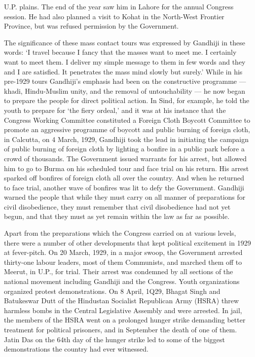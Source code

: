 U.P. plains. The end of the year saw him in Lahore for the annual Congress session. He had also planned a visit to Kohat in the North-West Frontier Province, but was refused permission by the Government. 

The significance of these mass contact tours was expressed by Gandhiji in these words: `I travel because I fancy that the masses want to meet me. I certainly want to meet them. I deliver my simple message to them in few words and they and I are satisfied. It penetrates the mass mind slowly but surely.' While in his pre-1929 tours Gandhiji's emphasis had been on the constructive programme — khadi, Hindu-Muslim unity, and the removal of untouchability — he now began to prepare the people for direct political action. In Sind, for example, he told the youth to prepare for `the fiery ordeal,' and it was at his instance that the Congress Working Committee constituted a Foreign Cloth Boycott Committee to promote an aggressive programme of boycott and public burning of foreign cloth, in Calcutta, on 4 March, 1929, Gandhiji took the lead in initiating the campaign of public burning of foreign cloth by lighting a bonfire in a public park before a crowd of thousands. The Government issued warrants for his arrest, but allowed him to go to Burma on his scheduled tour and face trial on his return. His arrest sparked off bonfires of foreign cloth all over the country. And when he returned to face trial, another wave of bonfires was lit to defy the Government. Gandhiji warned the people that while they must carry on all manner of preparations for civil disobedience, they must remember that civil disobedience had not yet begun, and that they must as yet remain within the law as far as possible. 

Apart from the preparations which the Congress carried on at various levels, there were a number of other developments that kept political excitement in 1929 at fever-pitch. On 20 March, 1929, in a major swoop, the Government arrested thirty-one labour leaders, most of them Communists, and marched them off to Meerut, in U.P., for trial. Their arrest was condemned by all sections of the national movement including Gandhiji and the Congress. Youth organizations organized protest demonstrations. On 8 April, 1Q29, Bhagat Singh and Batukeswar Dutt of the Hindustan Socialist Republican Army (HSRA) threw harmless bombs in the Central Legislative Assembly and were arrested. In jail, the members of the HSRA went on a prolonged hunger strike demanding better treatment for political prisoners, and in September the death of one of them. Jatin Das on the 64th day of the hunger strike led to some of the biggest demonstrations the country had ever witnessed. 

